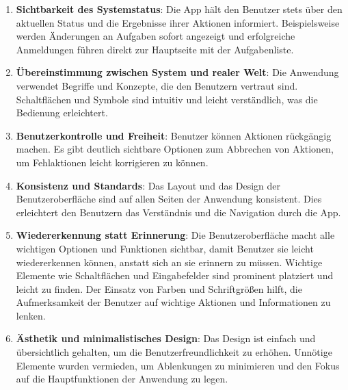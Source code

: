 \begin{enumerate}
	\item \textbf{Sichtbarkeit des Systemstatus}: Die App hält den Benutzer stets über den aktuellen Status und die Ergebnisse ihrer Aktionen informiert. Beispielsweise werden Änderungen an Aufgaben sofort angezeigt und erfolgreiche Anmeldungen führen direkt zur Hauptseite mit der Aufgabenliste.
	\item \textbf{Übereinstimmung zwischen System und realer Welt}: Die Anwendung verwendet Begriffe und Konzepte, die den Benutzern vertraut sind. Schaltflächen und Symbole sind intuitiv und leicht verständlich, was die Bedienung erleichtert.
	\item \textbf{Benutzerkontrolle und Freiheit}: Benutzer können Aktionen rückgängig machen. Es gibt deutlich sichtbare Optionen zum Abbrechen von Aktionen, um Fehlaktionen leicht korrigieren zu können.
	\item \textbf{Konsistenz und Standards}: Das Layout und das Design der Benutzeroberfläche sind auf allen Seiten der Anwendung konsistent. Dies erleichtert den Benutzern das Verständnis und die Navigation durch die App.
	\item \textbf{Wiedererkennung statt Erinnerung}: Die Benutzeroberfläche macht alle wichtigen Optionen und Funktionen sichtbar, damit Benutzer sie leicht wiedererkennen können, anstatt sich an sie erinnern zu müssen. Wichtige Elemente wie Schaltflächen und Eingabefelder sind prominent platziert und leicht zu finden. Der Einsatz von Farben und Schriftgrößen hilft, die Aufmerksamkeit der Benutzer auf wichtige Aktionen und Informationen zu lenken.
	\item \textbf{Ästhetik und minimalistisches Design}: Das Design ist einfach und übersichtlich gehalten, um die Benutzerfreundlichkeit zu erhöhen. Unnötige Elemente wurden vermieden, um Ablenkungen zu minimieren und den Fokus auf die Hauptfunktionen der Anwendung zu legen.
\end{enumerate}

